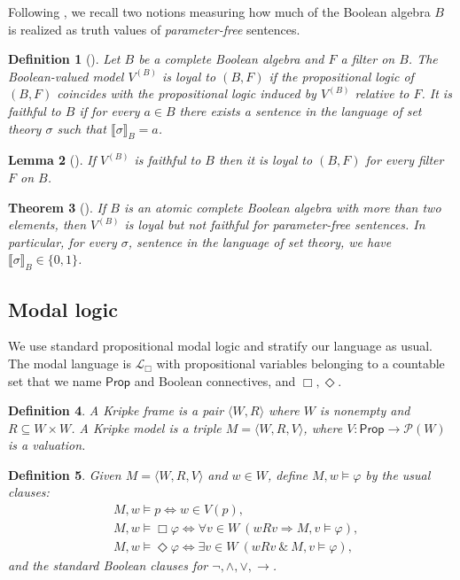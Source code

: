 \documentclass[10pt,a4paper]{amsart}
\newtheorem{definition}{Definition}[section]
\newtheorem{theorem}[definition]{Theorem}
\newtheorem{lemma}[definition]{Lemma}
\newcommand{\Pow}{\mathcal P}
\newcommand{\Prop}{\mathsf{Prop}}
\newcommand{\Lbox}{\mathcal L_{\Box}} %
\newcommand{\val}[1]{\llbracket #1\rrbracket_B}
\begin{document}
Following \cite{LowePassmannTarafder}, we recall two notions measuring how much of the Boolean algebra $B$
is realized as truth values of \emph{parameter-free} sentences.

\begin{definition}[\cite{LowePassmannTarafder}]\label{def:faithful-loyal}
Let $B$ be a complete Boolean algebra and $F$ a filter on $B$.
The Boolean-valued model $V^{(B)}$ is \emph{loyal} to $(B,F)$ if the propositional logic of $(B,F)$
coincides with the propositional logic induced by $V^{(B)}$ relative to $F$.
It is \emph{faithful to $B$} if for every $a\in B$ there exists a sentence in the language of set theory $\sigma$ such that $\val{\sigma}=a$.
\end{definition}

\begin{lemma}[\cite{LowePassmannTarafder}]\label{lem:faithful-implies-loyal}
If $V^{(B)}$ is faithful to $B$ then it is loyal to $(B,F)$ for every filter $F$ on $B$.
\end{lemma}

\begin{theorem}[\cite{LowePassmannTarafder}]\label{thm:atomic-not-faithful}
If $B$ is an atomic complete Boolean algebra with more than two elements, then $V^{(B)}$ is loyal but not
faithful for parameter-free sentences. In particular, for every $\sigma$, sentence in the language of set theory,  we have
$\val{\sigma}\in\{0,1\}$.
\end{theorem}

\subsection{Modal logic}

We use standard propositional modal logic and stratify our language as usual.
The modal language is $\Lbox$ with propositional variables belonging to a countable set that we name $\Prop$ and Boolean connectives, and $\Box,\Diamond$.

\begin{definition}
A \emph{Kripke frame} is a pair $\langle W,R\rangle$ where $W$ is nonempty and $R\subseteq W\times W$.
A \emph{Kripke model} is a triple $M=\langle W,R,V\rangle$, where $V:\Prop\to \Pow(W)$ is a valuation.
\end{definition}

\begin{definition}\label{def:sat}
Given $M=\langle W,R,V\rangle$ and $w\in W$, define $M,w\models\varphi$ by the usual clauses:
\[
\begin{aligned}
&M,w\models p \iff w\in V(p),\\
&M,w\models \Box\varphi \iff \forall v\in W\ (wRv\Rightarrow M,v\models\varphi),\\
&M,w\models \Diamond\varphi \iff \exists v\in W\ (wRv\ \&\ M,v\models\varphi),
\end{aligned}
\]
and the standard Boolean clauses for $\neg,\wedge,\vee,\to$.
\end{definition}
\end{document}
